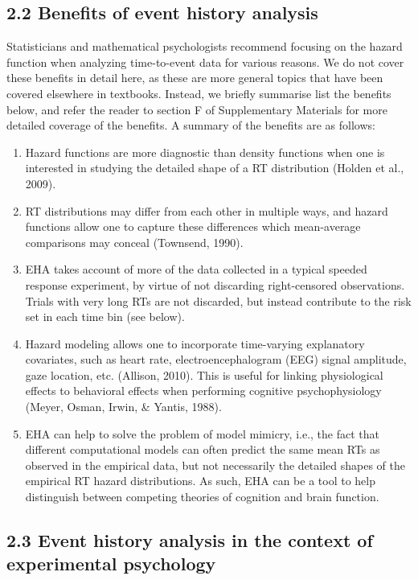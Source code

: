 \documentclass[
  man, donotrepeattitle,floatsintext]{apa6}
\begin{document}
\subsection{2.2 Benefits of event history analysis}\label{benefits-of-event-history-analysis}

Statisticians and mathematical psychologists recommend focusing on the hazard function when analyzing time-to-event data for various reasons. We do not cover these benefits in detail here, as these are more general topics that have been covered elsewhere in textbooks. Instead, we briefly summarise list the benefits below, and refer the reader to section F of Supplementary Materials for more detailed coverage of the benefits. A summary of the benefits are as follows:

\begin{enumerate}
\def\labelenumi{\arabic{enumi}.}
\item
  Hazard functions are more diagnostic than density functions when one is interested in studying the detailed shape of a RT distribution (Holden et al., 2009).
\item
  RT distributions may differ from each other in multiple ways, and hazard functions allow one to capture these differences which mean-average comparisons may conceal (Townsend, 1990).
\item
  EHA takes account of more of the data collected in a typical speeded response experiment, by virtue of not discarding right-censored observations. Trials with very long RTs are not discarded, but instead contribute to the risk set in each time bin (see below).
\item
  Hazard modeling allows one to incorporate time-varying explanatory covariates, such as heart rate, electroencephalogram (EEG) signal amplitude, gaze location, etc. (Allison, 2010). This is useful for linking physiological effects to behavioral effects when performing cognitive psychophysiology (Meyer, Osman, Irwin, \& Yantis, 1988).
\item
  EHA can help to solve the problem of model mimicry, i.e., the fact that different computational models can often predict the same mean RTs as observed in the empirical data, but not necessarily the detailed shapes of the empirical RT hazard distributions. As such, EHA can be a tool to help distinguish between competing theories of cognition and brain function.
\end{enumerate}

\subsection{2.3 Event history analysis in the context of experimental psychology}\label{event-history-analysis-in-the-context-of-experimental-psychology}
\end{document}
